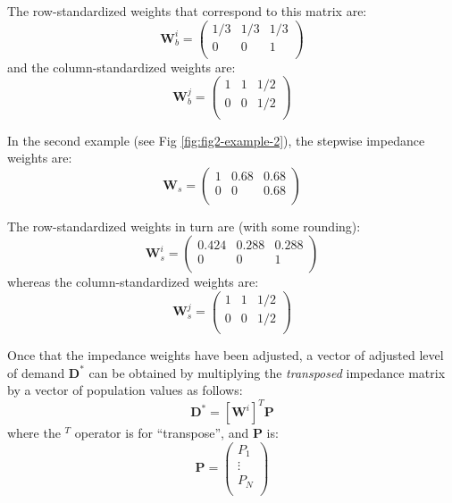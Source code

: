 \documentclass[10pt,letterpaper]{article}
\begin{document}
The row-standardized weights that correspond to this matrix are: \[
\mathbf{W}^{i}_b = \left(\begin{array}{ccc}
            1/3 & 1/3 & 1/3\\
            0 & 0 & 1\\
        \end{array}
        \right)
\] and the column-standardized weights are: \[
\mathbf{W}^{j}_b = \left(\begin{array}{ccc}
            1 & 1 & 1/2\\
            0 & 0 & 1/2\\
        \end{array}
        \right)
\]

In the second example (see Fig \ref{fig:fig2-example-2}), the stepwise
impedance weights are: \[
\mathbf{W}_s = \left(\begin{array}{ccc}
            1 & 0.68 & 0.68\\
            0 & 0 & 0.68\\
        \end{array}
        \right)
\]

The row-standardized weights in turn are (with some rounding): \[
\mathbf{W}^{i}_s = \left(\begin{array}{ccc}
            0.424 & 0.288 & 0.288\\
            0 & 0 & 1\\
        \end{array}
        \right)
\] whereas the column-standardized weights are: \[
\mathbf{W}^{j}_s = \left(\begin{array}{ccc}
            1 & 1 & 1/2\\
            0 & 0 & 1/2\\
        \end{array}
        \right)
\]

Once that the impedance weights have been adjusted, a vector of adjusted
level of demand \(\mathbf{D}^*\) can be obtained by multiplying the
\emph{transposed} impedance matrix by a vector of population values as
follows: \[
\mathbf{D}^* = [\mathbf{W}^{i}]^T\mathbf{P}
\] where the \(^T\) operator is for ``transpose'', and \(\mathbf{P}\)
is: \[
\mathbf{P} = \left(\begin{array}{c}
            P_1\\
            \vdots\\
            P_N\\
        \end{array}
        \right) 
\]
\end{document}
